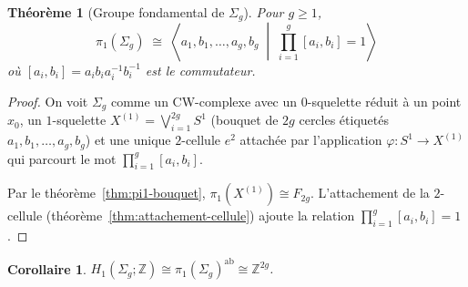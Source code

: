\documentclass[12pt,a4paper,openany]{book}
\theoremstyle{definition}
\theoremstyle{plain}
\newtheorem{theoreme}[definition]{Théorème}
\newtheorem{corollaire}[definition]{Corollaire}
\theoremstyle{remark}
\newcommand{\Z}{\mathbb{Z}}
\begin{document}
\begin{center}
\end{center}

\begin{theoreme}[{Groupe fondamental de $\Sigma_g$}]\label{thm:pi1-sigma-g}
Pour $g \geq 1$,
\[
\pi_1(\Sigma_g) \;\cong\; \left\langle
a_1, b_1, \ldots, a_g, b_g \;\middle|\;
\prod_{i=1}^g [a_i, b_i] = 1
\right\rangle
\]
où $[a_i, b_i] = a_i b_i a_i^{-1} b_i^{-1}$ est le commutateur.
\end{theoreme}

\begin{proof}
On voit $\Sigma_g$ comme un CW-complexe avec un $0$-squelette réduit à un point $x_0$,
un $1$-squelette $X^{(1)} = \bigvee_{i=1}^{2g} S^1$ (bouquet de $2g$ cercles étiquetés
$a_1, b_1, \ldots, a_g, b_g$) et une unique $2$-cellule $e^2$ attachée par l'application
$\varphi \colon S^1 \to X^{(1)}$ qui parcourt le mot $\prod_{i=1}^g [a_i, b_i]$.

Par le théorème~\ref{thm:pi1-bouquet}, $\pi_1(X^{(1)}) \cong F_{2g}$. L'attachement de la
$2$-cellule (théorème~\ref{thm:attachement-cellule}) ajoute la relation
$\prod_{i=1}^g [a_i, b_i] = 1$.
\end{proof}

\begin{corollaire}\label{cor:abelianise-sigma}
$H_1(\Sigma_g; \Z) \cong \pi_1(\Sigma_g)^{\mathrm{ab}} \cong \Z^{2g}$.
\end{corollaire}
\end{document}
